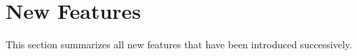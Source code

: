 
\chapter{New Features}
\label{section:NewFeatures}

This section summarizes all new features that have been introduced
successively. 










